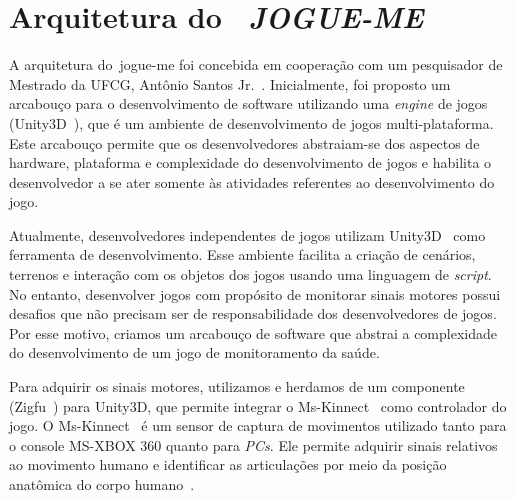 \section{Arquitetura do ~\textit{JOGUE-ME}}\label{sec:cliente_game}
A arquitetura do~\ac{jogue-me} foi concebida em cooperação com um pesquisador de Mestrado da UFCG, Antônio Santos Jr.~\cite{antonio2013}. Inicialmente, foi proposto um arcabouço para o desenvolvimento de software utilizando uma \textit{engine} de jogos (Unity3D~\cite{unity3d}), que é um ambiente de desenvolvimento de jogos multi-plataforma. Este arcabouço permite que os desenvolvedores abstraiam-se dos aspectos de hardware, plataforma e complexidade do desenvolvimento de jogos e habilita o desenvolvedor a se ater somente às atividades referentes ao desenvolvimento do jogo.

Atualmente, desenvolvedores independentes de jogos utilizam Unity3D~\cite{unity3d} como ferramenta de desenvolvimento. Esse ambiente facilita a criação de cenários, terrenos e interação com os objetos dos jogos usando uma linguagem de \textit{script}. No entanto, desenvolver jogos com propósito de monitorar sinais motores possui desafios que não precisam ser de responsabilidade dos desenvolvedores de jogos. Por esse motivo, criamos um arcabouço de software que abstrai a complexidade do desenvolvimento de um jogo de monitoramento da saúde.


Para adquirir os sinais motores, utilizamos e herdamos de um componente (Zigfu~\cite{zigfu}) para Unity3D, que permite integrar o Ms-Kinnect~\cite{kinnect2013} como controlador do jogo. O Ms-Kinnect~\cite{kinnect2013} é um sensor de captura de movimentos utilizado tanto para o console MS-XBOX 360 quanto para \textit{PCs}. Ele permite adquirir sinais relativos ao movimento humano e identificar as articulações por meio da posição anatômica do corpo humano~\cite{hamill1999bases}.





